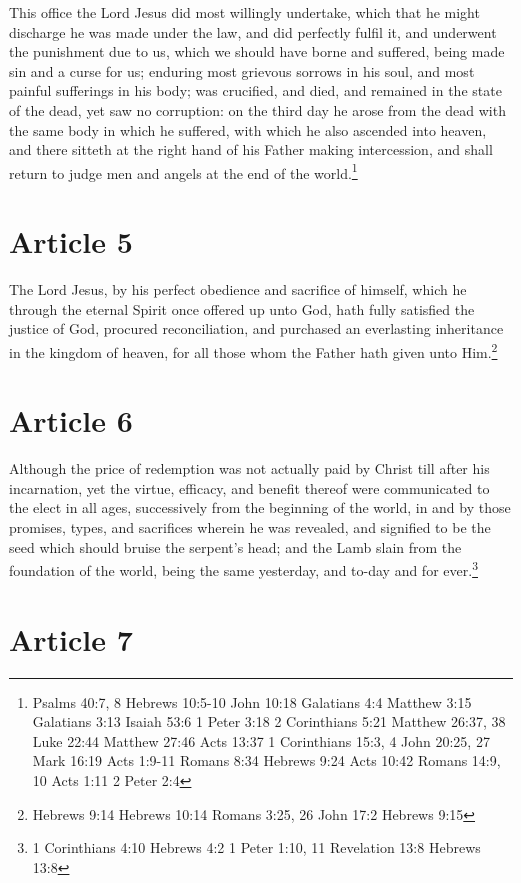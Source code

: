 \documentclass[12pt,letterpaper]{book}
\begin{document}
This office the Lord Jesus did most willingly undertake, which that he might discharge he was made under the law, and did perfectly fulfil it, and underwent the punishment due to us, which we should have borne and suffered, being made sin and a curse for us; enduring most grievous sorrows in his soul, and most painful sufferings in his body; was crucified, and died, and remained in the state of the dead, yet saw no corruption: on the third day he arose from the dead with the same body in which he suffered, with which he also ascended into heaven, and there sitteth at the right hand of his Father making intercession, and shall return to judge men and angels at the end of the world.\footnote{Psalms 40:7, 8 Hebrews 10:5-10 John 10:18 Galatians 4:4 Matthew 3:15 Galatians 3:13 Isaiah 53:6 1 Peter 3:18 2 Corinthians 5:21 Matthew 26:37, 38 Luke 22:44 Matthew 27:46 Acts 13:37 1 Corinthians 15:3, 4 John 20:25, 27 Mark 16:19 Acts 1:9-11 Romans 8:34 Hebrews 9:24 Acts 10:42 Romans 14:9, 10 Acts 1:11 2 Peter 2:4}

\section{Article 5}

The Lord Jesus, by his perfect obedience and sacrifice of himself, which he through the eternal Spirit once offered up unto God, hath fully satisfied the justice of God, procured reconciliation, and purchased an everlasting inheritance in the kingdom of heaven, for all those whom the Father hath given unto Him.\footnote{Hebrews 9:14 Hebrews 10:14 Romans 3:25, 26 John 17:2 Hebrews 9:15}

\section{Article 6}

Although the price of redemption was not actually paid by Christ till after his incarnation, yet the virtue, efficacy, and benefit thereof were communicated to the elect in all ages, successively from the beginning of the world, in and by those promises, types, and sacrifices wherein he was revealed, and signified to be the seed which should bruise the serpent's head; and the Lamb slain from the foundation of the world, being the same yesterday, and to-day and for ever.\footnote{1 Corinthians 4:10 Hebrews 4:2 1 Peter 1:10, 11 Revelation 13:8 Hebrews 13:8}

\section{Article 7}
\end{document}
